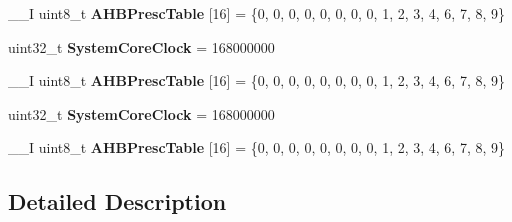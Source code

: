 \begin{DoxyCompactItemize}
\item 
\hypertarget{group___s_t_m32_f4xx___system___private___variables_gacdc3ef54c0704c90e69a8a84fb2d970d}{\-\_\-\-\_\-\-I uint8\-\_\-t {\bfseries A\-H\-B\-Presc\-Table} \mbox{[}16\mbox{]} = \{0, 0, 0, 0, 0, 0, 0, 0, 1, 2, 3, 4, 6, 7, 8, 9\}}\label{group___s_t_m32_f4xx___system___private___variables_gacdc3ef54c0704c90e69a8a84fb2d970d}

\item 
\hypertarget{group___s_t_m32_f4xx___system___private___variables_gaa3cd3e43291e81e795d642b79b6088e6}{uint32\-\_\-t {\bfseries System\-Core\-Clock} = 168000000}\label{group___s_t_m32_f4xx___system___private___variables_gaa3cd3e43291e81e795d642b79b6088e6}

\item 
\hypertarget{group___s_t_m32_f4xx___system___private___variables_gacdc3ef54c0704c90e69a8a84fb2d970d}{\-\_\-\-\_\-\-I uint8\-\_\-t {\bfseries A\-H\-B\-Presc\-Table} \mbox{[}16\mbox{]} = \{0, 0, 0, 0, 0, 0, 0, 0, 1, 2, 3, 4, 6, 7, 8, 9\}}\label{group___s_t_m32_f4xx___system___private___variables_gacdc3ef54c0704c90e69a8a84fb2d970d}

\item 
\hypertarget{group___s_t_m32_f4xx___system___private___variables_gaa3cd3e43291e81e795d642b79b6088e6}{uint32\-\_\-t {\bfseries System\-Core\-Clock} = 168000000}\label{group___s_t_m32_f4xx___system___private___variables_gaa3cd3e43291e81e795d642b79b6088e6}

\item 
\hypertarget{group___s_t_m32_f4xx___system___private___variables_gacdc3ef54c0704c90e69a8a84fb2d970d}{\-\_\-\-\_\-\-I uint8\-\_\-t {\bfseries A\-H\-B\-Presc\-Table} \mbox{[}16\mbox{]} = \{0, 0, 0, 0, 0, 0, 0, 0, 1, 2, 3, 4, 6, 7, 8, 9\}}\label{group___s_t_m32_f4xx___system___private___variables_gacdc3ef54c0704c90e69a8a84fb2d970d}

\end{DoxyCompactItemize}


\subsection{Detailed Description}
